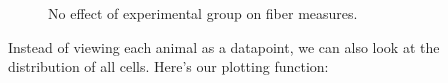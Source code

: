 \documentclass[
  12pt,
  letterpaper,
  DIV=11,
  numbers=noendperiod]{scrartcl}
\begin{document}
\begin{figure}
\begin{minipage}[t]{0.33\linewidth}
{{}

}

\subcaption{\label{fig-expgroup-4}}
\end{minipage}%
%
\begin{minipage}[t]{0.33\linewidth}

{\centering 


}

\subcaption{\label{fig-expgroup-5}}
\end{minipage}%

\caption{\label{fig-expgroup}No effect of experimental group on fiber
measures.}

\end{figure}

Instead of viewing each animal as a datapoint, we can also look at the
distribution of all cells. Here's our plotting function:
\end{document}
